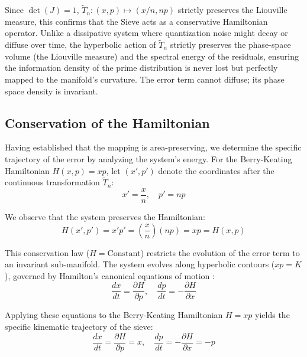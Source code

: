 \documentclass[sn-mathphys-num, pdflatex, referee]{sn-jnl}
\begin{document}
Since $\det(J) = 1$, $\tilde{T}_n: (x,p) \mapsto (x/n, np)$ strictly preserves the Liouville measure, this confirms that the Sieve acts as a conservative Hamiltonian operator. Unlike a dissipative system where quantization noise might decay or diffuse over time, the hyperbolic action of $\tilde{T}_n$ strictly preserves the phase-space volume (the Liouville measure) and the spectral energy of the residuals, ensuring the information density of the prime distribution is never lost but perfectly mapped to the manifold's curvature. The error term cannot diffuse; its phase space density is invariant.

\subsection{Conservation of the Hamiltonian}
\label{sec:hamiltonian}
Having established that the mapping is area-preserving, we determine the specific trajectory of the error by analyzing the system's energy. For the Berry-Keating Hamiltonian \cite{berry1999riemann} $H(x,p) = xp$, let $(x', p')$ denote the coordinates after the continuous transformation $\tilde{T}_n$:
\begin{equation}
x' = \frac{x}{n}, \quad p' = n p
\label{eq:transform_coords}
\end{equation}

We observe that the system preserves the Hamiltonian:
\begin{equation}
H(x', p') = x' p' = \left( \frac{x}{n} \right) (np) = xp = H(x, p)
\label{eq:H_const}
\end{equation}

This conservation law ($H = \text{Constant}$) restricts the evolution of the error term to an invariant sub-manifold. The system evolves along hyperbolic contours ($xp = K$), governed by Hamilton's canonical equations of motion \cite{arnold1989}:
\begin{equation}
\frac{dx}{dt} = \frac{\partial H}{\partial p}, \quad \frac{dp}{dt} = -\frac{\partial H}{\partial x}
\label{eq:ham_eqs}
\end{equation}

Applying these equations to the Berry-Keating Hamiltonian $H=xp$ \cite{berry1999riemann} yields the specific kinematic trajectory of the sieve:
\begin{equation}
\frac{dx}{dt} = \frac{\partial H}{\partial p} = x, \quad \frac{dp}{dt} = -\frac{\partial H}{\partial x} = -p
\label{eq:kinematic_traj}
\end{equation}
\end{document}
